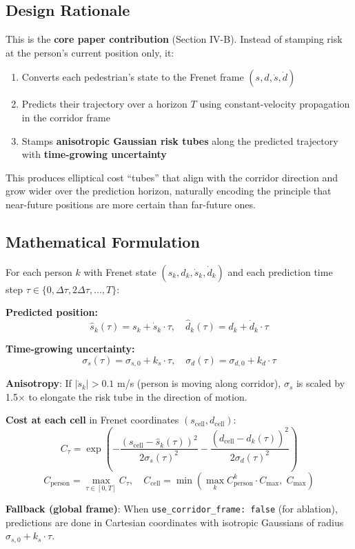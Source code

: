 \documentclass[11pt]{article}
\newcommand{\logentry}[1]{\subsection*{#1}}
\begin{document}
\logentry{Design Rationale}
This is the \textbf{core paper contribution} (Section IV-B). Instead of
stamping risk at the person's current position only, it:
\begin{enumerate}
  \item Converts each pedestrian's state to the Frenet frame $(s, d, \dot{s}, \dot{d})$
  \item Predicts their trajectory over a horizon $T$ using constant-velocity
    propagation in the corridor frame
  \item Stamps \textbf{anisotropic Gaussian risk tubes} along the predicted
    trajectory with \textbf{time-growing uncertainty}
\end{enumerate}

This produces elliptical cost ``tubes'' that align with the corridor direction
and grow wider over the prediction horizon, naturally encoding the principle
that near-future positions are more certain than far-future ones.

\logentry{Mathematical Formulation}

For each person $k$ with Frenet state $(s_k, d_k, \dot{s}_k, \dot{d}_k)$
and each prediction time step $\tau \in \{0, \Delta\tau, 2\Delta\tau, \ldots, T\}$:

\textbf{Predicted position:}
\[
  \hat{s}_k(\tau) = s_k + \dot{s}_k \cdot \tau, \quad
  \hat{d}_k(\tau) = d_k + \dot{d}_k \cdot \tau
\]

\textbf{Time-growing uncertainty:}
\[
  \sigma_s(\tau) = \sigma_{s,0} + k_s \cdot \tau, \quad
  \sigma_d(\tau) = \sigma_{d,0} + k_d \cdot \tau
\]

\textbf{Anisotropy}: If $|\dot{s}_k| > 0.1$ m/s (person is moving along
corridor), $\sigma_s$ is scaled by 1.5$\times$ to elongate the risk tube in
the direction of motion.

\textbf{Cost at each cell} in Frenet coordinates $(s_\mathrm{cell}, d_\mathrm{cell})$:
\[
  C_\tau = \exp\!\left(
    -\frac{(s_\mathrm{cell} - \hat{s}_k(\tau))^2}{2\sigma_s(\tau)^2}
    -\frac{(d_\mathrm{cell} - \hat{d}_k(\tau))^2}{2\sigma_d(\tau)^2}
  \right)
\]
\[
  C_\mathrm{person} = \max_{\tau \in [0, T]} C_\tau, \quad
  C_\mathrm{cell} = \min\!\left(
    \max_k C_\mathrm{person}^k \cdot C_\mathrm{max},\;
    C_\mathrm{max}
  \right)
\]

\textbf{Fallback (global frame)}: When \texttt{use\_corridor\_frame: false}
(for ablation), predictions are done in Cartesian coordinates with isotropic
Gaussians of radius $\sigma_{s,0} + k_s \cdot \tau$.
\end{document}
